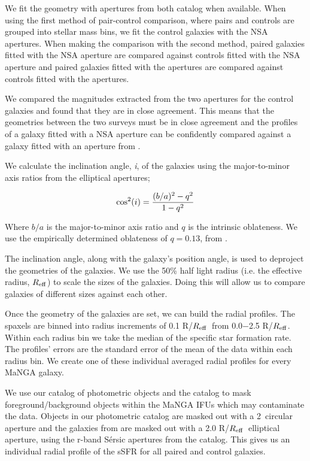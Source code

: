 \documentclass[iop,revtex4,twocolumn,apj,numberedappendix,appendixfloats]{emulateapj}
\newcommand{\reff}{$R_{\rm eff}$}
\begin{document}
We fit the geometry with apertures from both catalog when available. When using the first method of pair-control comparison, where pairs and controls are grouped into stellar mass bins, we fit the control galaxies with the NSA apertures. When making the comparison with the second method, paired galaxies fitted with the NSA aperture are compared against controls fitted with the NSA aperture and paired galaxies fitted with the \citet{Simard:2011} apertures are compared against controls fitted with the \citet{Simard:2011} apertures. 

We compared the magnitudes extracted from the two apertures for the control galaxies and found that they are in close agreement. This means that the geometries between the two surveys must be in close agreement and the profiles of a galaxy fitted with a NSA aperture can be confidently compared against a galaxy fitted with an aperture from \citet{Simard:2011}. 

We calculate the inclination angle, {\it i}, of the galaxies using the major-to-minor axis ratios from the elliptical apertures;

\begin{equation}
{\rm cos^2}(i) = \frac{(b/a)^2 - q^2}{1 - q^2}
\end{equation}

Where $b/a$ is the major-to-minor axis ratio and $q$ is the intrinsic oblateness. We use the empirically determined oblateness of $q = 0.13$, from \citet{Giovanelli:1994}.

The inclination angle, along with the galaxy's position angle, is used to deproject the geometries of the galaxies. We use the 50\% half light radius (i.e. the effective radius, \reff) to scale the sizes of the galaxies. Doing this will allow us to compare galaxies of different sizes against each other.

Once the geometry of the galaxies are set, we can build the radial profiles. The spaxels are binned into radius increments of 0.1 R/\reff\ from 0.0$-$2.5 R/\reff. Within each radius bin we take the median of the specific star formation rate. The profiles' errors are the standard error of the mean of the data within each radius bin. We create one of these individual averaged radial profiles for every MaNGA galaxy. 

We use our catalog of photometric objects and the \citet{Simard:2011} catalog to mask foreground/background objects within the MaNGA IFUs which may contaminate the data. Objects in our photometric catalog are masked out with a 2\arcsec\ circular aperture and the galaxies from \citet{Simard:2011} are masked out with a 2.0 R/\reff\ elliptical aperture, using the r-band S\'ersic apertures from the catalog. This gives us an individual radial profile of the sSFR for all paired and control galaxies.
\end{document}
